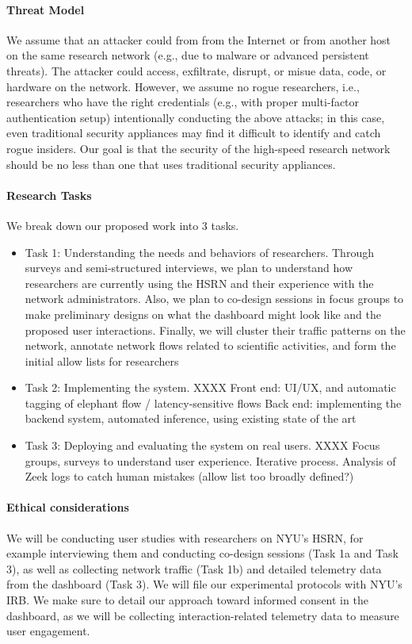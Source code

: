\paragraph{Threat Model}
We assume that an attacker could from from the Internet or from another host on the same research network (e.g., due to malware or advanced persistent threats). The attacker could access, exfiltrate, disrupt, or misue data, code, or hardware on the network. However, we assume no rogue researchers, i.e., researchers who have the right credentials (e.g., with proper multi-factor authentication setup) intentionally conducting the above attacks; in this case, even traditional security appliances may find it difficult to identify and catch rogue insiders. Our goal is that the security of the high-speed research network should be no less than one that uses traditional security appliances.


\paragraph{Research Tasks}
We break down our proposed work into 3 tasks.

\begin{itemize}
    \item Task 1: Understanding the needs and behaviors of researchers.
    Through surveys and semi-structured interviews, we plan to understand how researchers are currently using the HSRN and their experience with the network administrators. Also, we plan to co-design sessions in focus groups to make preliminary designs on what the dashboard might look like and the proposed user interactions.
    Finally, we will cluster their traffic patterns on the network, annotate network flows related to scientific activities, and form the initial allow lists for researchers
    \item Task 2: Implementing the system. XXXX
    Front end: UI/UX, and automatic tagging of elephant flow / latency-sensitive flows
    Back end: implementing the backend system, automated inference, using existing state of the art
    \item Task 3: Deploying and evaluating the system on real users. XXXX
    Focus groups, surveys to understand user experience. Iterative process.
    Analysis of Zeek logs to catch human mistakes (allow list too broadly defined?)
\end{itemize}



\paragraph{Ethical considerations}
We will be conducting user studies with researchers on NYU's HSRN, for example interviewing them and conducting co-design sessions (Task 1a and Task 3), as well as collecting network traffic (Task 1b) and detailed telemetry data from the dashboard (Task 3). We will file our experimental protocols with NYU's IRB. We make sure to detail our approach toward informed consent in the dashboard, as we will be collecting interaction-related telemetry data to measure user engagement.


